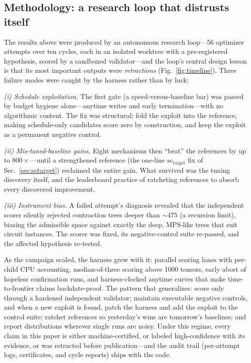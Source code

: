 \documentclass{SciPost}
\newcommand{\scT}{\ensuremath{\mathrm{sc}_{\mathrm{target}}}}
\begin{document}
\begin{appendix}
\section{Methodology: a research loop that distrusts itself}
\label{sec:method}

The results above were produced by an autonomous research loop---56
optimizer attempts over ten cycles, each in an isolated worktree with a
pre-registered hypothesis, scored by a sandboxed validator---and the
loop's central design lesson is that its most important outputs were
\emph{retractions} (Fig.~\ref{fig:timeline}). Three failure modes were
caught by the harness rather than by luck:

\emph{(i) Schedule exploitation.} The first gate (a speed-versus-baseline
bar) was passed by budget hygiene alone---anytime writes and early
termination---with no algorithmic content. The fix was structural: fold
the exploit into the reference, making schedule-only candidates score
zero by construction, and keep the exploit as a permanent negative
control.

\emph{(ii) Mis-tuned-baseline gains.} Eight mechanisms then ``beat'' the
references by up to $800\times$---until a strengthened reference (the
one-line $\scT$ fix of Sec.~\ref{sec:sctarget}) reclaimed the entire
gain. What survived was the tuning discovery itself, and the leaderboard
practice of ratcheting references to absorb every discovered improvement.

\emph{(iii) Instrument bias.} A failed attempt's diagnosis revealed that
the independent scorer silently rejected contraction trees deeper than
$\sim\!475$ (a recursion limit), biasing the admissible space against
exactly the deep, MPS-like trees that suit circuit instances. The scorer
was fixed, its negative-control suite re-passed, and the affected
hypothesis re-tested.

As the campaign scaled, the harness grew with it: parallel scoring lanes
with per-child CPU accounting, median-of-three scoring above 1000
tensors, early abort of hopeless confirmation runs, and harness-clocked
anytime curves that make time-to-frontier claims backdate-proof. The
pattern that generalizes: score only through a hardened independent
validator; maintain executable negative controls, and when a new exploit
is found, patch the harness and add the exploit to the control suite;
ratchet references so yesterday's wins are tomorrow's baselines; and
report distributions wherever single runs are noisy. Under this regime,
every claim in this paper is either machine-certified, or labeled
high-confidence with its evidence, or was retracted before
publication---and the audit trail (per-attempt logs, certificates, and
cycle reports) ships with the code.


\end{appendix}
\end{document}
